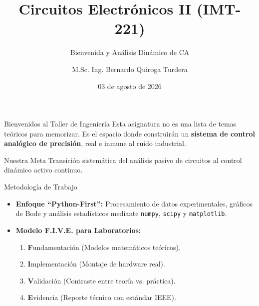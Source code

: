 \documentclass[aspectratio=169, 10pt]{beamer}
\title[IMT-221 \textbar{} Sesión 1]{Circuitos Electrónicos II (IMT-221)}
\subtitle{Bienvenida y Análisis Dinámico de CA}
\author{M.Sc. Ing. Bernardo Quiroga Turdera}
\institute[UCB Tarija]{Universidad Católica Boliviana ``San Pablo'' - Sede Tarija \\ Carrera de Ingeniería Mecatrónica}
\date{03 de agosto de 2026}
\begin{document}
\begin{frame}
    \titlepage
\end{frame}

\begin{frame}{Bienvenidos al Taller de Ingeniería}
    Esta asignatura no es una lista de temas teóricos para memorizar. Es el espacio donde construirán un \textbf{sistema de control analógico de precisión}, real e inmune al ruido industrial.
    
    \vspace{0.5cm}
    \begin{block}{Nuestra Meta}
        Transición sistemática del análisis pasivo de circuitos al control dinámico activo continuo.
    \end{block}
\end{frame}

\begin{frame}{Metodología de Trabajo}
    \begin{itemize}
        \item \textbf{Enfoque ``Python-First'':} Procesamiento de datos experimentales, gráficos de Bode y análisis estadísticos mediante \texttt{numpy}, \texttt{scipy} y \texttt{matplotlib}.
        \vspace{0.3cm}
        \item \textbf{Modelo F.I.V.E. para Laboratorios:}
        \begin{enumerate}
            \item \textbf{F}undamentación (Modelos matemáticos teóricos).
            \item \textbf{I}mplementación (Montaje de hardware real).
            \item \textbf{V}alidación (Contraste entre teoría vs. práctica).
            \item \textbf{E}videncia (Reporte técnico con estándar IEEE).
        \end{enumerate}
    \end{itemize}
\end{frame}
\end{document}

